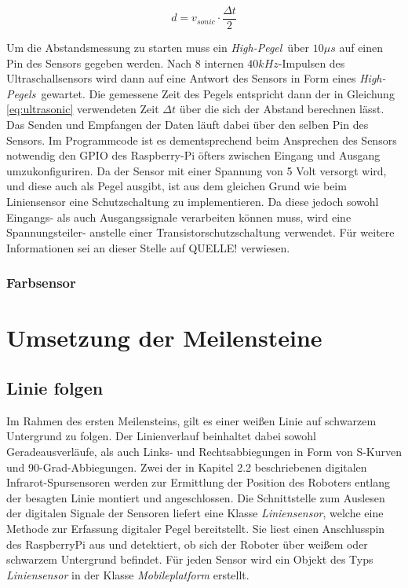 \documentclass[12pt,a4paper,oneside]{article}
\begin{document}
\begin{spacing}{1.15}
\begin{center}
	\begin{equation}
	d =  v_{sonic} \cdot \frac{\Delta t}{2}
	\label{eq:ultrasonic}
	\end{equation}
\end{center} 

Um die Abstandsmessung zu starten muss ein \glqq \textit{High-Pegel}\grqq \ über $10 \mu s$ auf einen Pin des Sensors gegeben werden. Nach 8 internen $40 kHz$-Impulsen des Ultraschallsensors wird dann auf eine Antwort des Sensors in Form eines \glqq \textit{High-Pegels}\grqq \ gewartet. Die gemessene Zeit des Pegels entspricht dann der in Gleichung \ref{eq:ultrasonic} verwendeten Zeit $\Delta t$ über die sich der Abstand berechnen lässt. Das Senden und Empfangen der Daten läuft dabei über den selben Pin des Sensors. Im Programmcode ist es dementsprechend beim Ansprechen des Sensors notwendig den GPIO des Raspberry-Pi öfters zwischen Eingang und Ausgang umzukonfiguriren. Da der Sensor mit einer Spannung von 5 Volt versorgt wird, und diese auch als Pegel ausgibt, ist aus dem gleichen Grund wie beim Liniensensor eine Schutzschaltung zu implementieren. Da diese jedoch sowohl Eingangs- als auch Ausgangssignale verarbeiten können muss, wird eine Spannungsteiler- anstelle einer Transistorschutzschaltung verwendet. Für weitere Informationen sei an dieser Stelle auf QUELLE! verwiesen.

\subsubsection{Farbsensor}

\newpage
\section{Umsetzung der Meilensteine}

	
\subsection{Linie folgen}
\textit{}	

Im Rahmen des ersten Meilensteins, gilt es einer weißen Linie auf schwarzem Untergrund zu folgen. Der Linienverlauf beinhaltet dabei sowohl Geradeausverläufe, als auch Links- und Rechtsabbiegungen in Form von S-Kurven und 90-Grad-Abbiegungen. Zwei der in Kapitel 2.2 beschriebenen digitalen Infrarot-Spursensoren werden zur Ermittlung der Position des Roboters entlang der besagten Linie montiert und angeschlossen. Die Schnittstelle zum Auslesen der digitalen Signale der Sensoren liefert eine Klasse \textit{Liniensensor}, welche eine Methode zur Erfassung digitaler Pegel bereitstellt. Sie liest einen Anschlusspin des RaspberryPi aus und detektiert, ob sich der Roboter über weißem oder schwarzem Untergrund befindet. Für jeden Sensor wird ein Objekt des Typs \textit{Liniensensor} in der Klasse \textit{Mobileplatform} erstellt.


\end{spacing}
\end{document}
